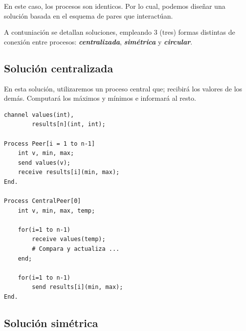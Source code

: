 \documentclass[a4paper, 10pt]{report}
\begin{document}
En este caso, los procesos son identicos. Por lo cual, podemos diseñar una solución basada en el esquema de pares que interactúan. 

A contuniación se detallan soluciones, empleando 3 (tres) formas distintas de conexión entre procesos: \textbf{\emph{centralizada}}, \textbf{\emph{simétrica}} y \textbf{\emph{circular}}.

\subsection{Solución centralizada}

En esta solución, utilizaremos un proceso central que; recibirá los valores de los demás. Computará los máximos y mínimos e informará al resto.

\begin{multicols}{2}
\begin{lstlisting}
channel values(int),
        results[n](int, int);
    
Process Peer[i = 1 to n-1]
    int v, min, max;
    send values(v);
    receive results[i](min, max);
End.

Process CentralPeer[0]
    int v, min, max, temp;

    for(i=1 to n-1)
        receive values(temp);
        # Compara y actualiza ...
    end;

    for(i=1 to n-1)
        send results[i](min, max);
End.
\end{lstlisting}

\columnbreak

\centering
\vspace*{\fill}
\vspace*{\fill}
\end{multicols}

\subsection{Solución simétrica}
\end{document}
